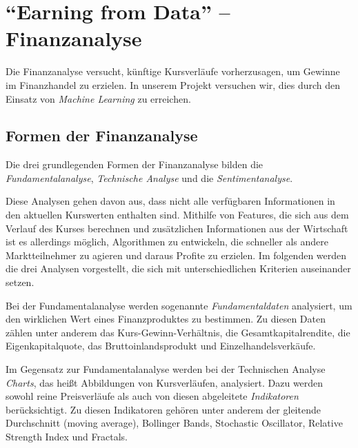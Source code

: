 \section{\enquote{Earning from Data} -- Finanzanalyse}
\label{sec:FinanzenIntro}

Die Finanzanalyse versucht, künftige Kursverläufe vorherzusagen, um Gewinne im Finanzhandel zu erzielen. In unserem Projekt versuchen wir, dies durch den Einsatz von \emph{Machine Learning} zu erreichen.

\subsection{Formen der Finanzanalyse}
\label{ssec:FinanzanalyseFormenIntro}

Die drei grundlegenden Formen der Finanzanalyse bilden die \emph{Fundamentalanalyse}, \emph{Technische Analyse} und die \emph{Sentimentanalyse}. 

Diese Analysen gehen davon aus, dass nicht alle verfügbaren Informationen in den aktuellen Kurswerten enthalten sind. Mithilfe von Features, die sich aus dem Verlauf des Kurses berechnen und zus\"atzlichen Informationen aus der Wirtschaft ist es allerdings möglich, Algorithmen zu entwickeln, die schneller als andere Marktteilnehmer zu agieren und daraus Profite zu erzielen. Im folgenden werden die drei Analysen vorgestellt, die sich mit unterschiedlichen Kriterien auseinander setzen.  


Bei der Fundamentalanalyse werden sogenannte \emph{Fundamentaldaten} analysiert, um den wirklichen Wert eines Finanzproduktes zu bestimmen. Zu diesen Daten zählen unter anderem das Kurs-Gewinn-Verhältnis, die Gesamtkapitalrendite, die Eigenkapitalquote, das Bruttoinlandsprodukt und Einzelhandelsverkäufe.

Im Gegensatz zur Fundamentalanalyse werden bei der Technischen Analyse \emph{Charts}, das heißt Abbildungen von Kursverläufen, analysiert. Dazu werden sowohl reine Preisverläufe als auch von diesen abgeleitete \emph{Indikatoren} berücksichtigt. Zu diesen Indikatoren gehören unter anderem der gleitende Durchschnitt (moving average), Bollinger Bands, Stochastic Oscillator, Relative Strength Index und Fractals.

